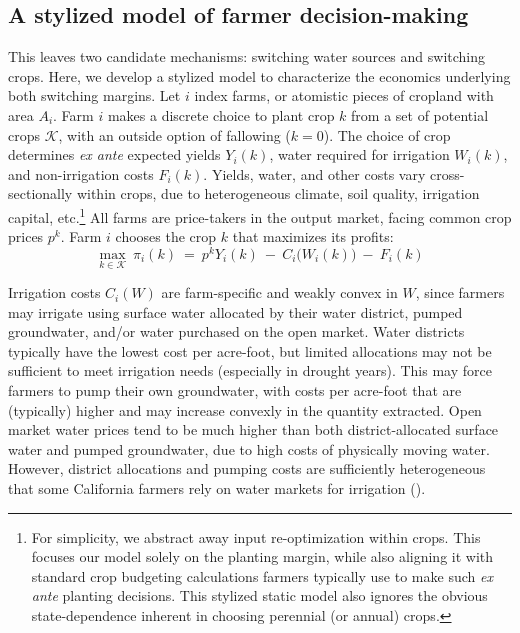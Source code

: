 \subsection{A stylized model of farmer decision-making}
\label{sec:farmmodel}
This leaves two candidate mechanisms: switching water sources and switching crops. Here, we develop a stylized model to characterize the economics underlying both switching margins. Let $i$ index farms, or atomistic pieces of cropland with area $A_i$. Farm $i$ makes a discrete choice to plant crop $k$ from a set of potential crops $\mathcal K$, with an outside option of fallowing ($k=0$). The choice of crop determines \emph{ex ante} expected yields $Y_i(k)$, water required for irrigation $W_i(k)$, and  non-irrigation costs $F_i(k)$. Yields, water, and other costs vary cross-sectionally within crops, due to  heterogeneous climate, soil quality, irrigation capital, etc.\footnote{
For simplicity, we abstract away input re-optimization within crops. This focuses our model solely on the planting margin, while also aligning it with standard crop budgeting calculations farmers typically use to make such \emph{ex ante} planting decisions. This stylized static model also ignores the obvious state-dependence inherent in choosing perennial (or annual) crops.
}
All farms are price-takers in the output market, facing common crop prices $p^k$. Farm $i$ chooses the crop $k$ that maximizes its profits:
\begin{equation}
\max_{k \in \mathcal K} 	~\pi_i(k) ~=~ p^k Y_i(k) ~-~C_i\big(W_i(k)\big) ~-~ F_i(k)
\end{equation}


Irrigation costs $C_i(W)$ are farm-specific and weakly convex in $W$, since farmers may irrigate using surface water allocated by their water district, pumped groundwater, and/or water purchased on the open market. Water districts typically have the lowest cost per acre-foot, but limited allocations may not be sufficient to meet irrigation needs (especially in drought years). This may force farmers to pump their own groundwater, with costs per acre-foot that are (typically) higher and may increase convexly in the quantity extracted. Open market water prices tend to be much higher than both district-allocated surface water and pumped groundwater, due to high costs of physically moving water. However, district allocations and pumping costs are sufficiently heterogeneous that some California farmers rely on water markets for irrigation (\textcite{hagerty2018}). 

